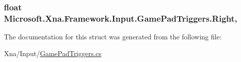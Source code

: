 \subsubsection[{Right}]{\setlength{\rightskip}{0pt plus 5cm}float Microsoft.\+Xna.\+Framework.\+Input.\+Game\+Pad\+Triggers.\+Right\hspace{0.3cm}{\ttfamily [get]}, {\ttfamily [set]}}\label{struct_microsoft_1_1_xna_1_1_framework_1_1_input_1_1_game_pad_triggers_ae95cfa58f6b8a000015da928da9ab2c0}


The documentation for this struct was generated from the following file\+:\begin{DoxyCompactItemize}
\item 
Xna/\+Input/\hyperlink{_game_pad_triggers_8cs}{Game\+Pad\+Triggers.\+cs}\end{DoxyCompactItemize}
